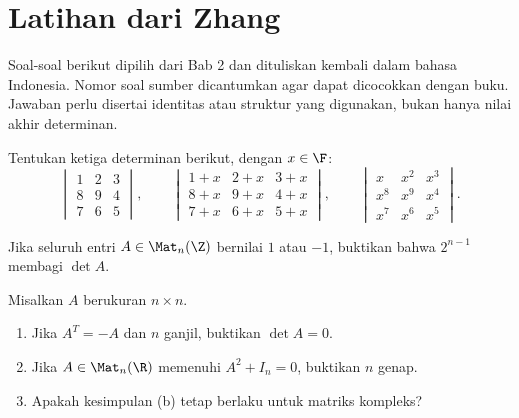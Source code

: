 \clearpage
\section{Latihan dari Zhang}
\label{det:latihan}

Soal-soal berikut dipilih dari Bab 2 \citet{zhang2009} dan dituliskan
kembali dalam bahasa Indonesia. Nomor soal sumber dicantumkan agar
dapat dicocokkan dengan buku. Jawaban perlu disertai identitas atau
struktur yang digunakan, bukan hanya nilai akhir determinan.

\begin{latihan}\label{det:lat-tigadeterminan}
      Tentukan ketiga determinan berikut, dengan $x\in\F$:
      \[
            \begin{vmatrix}1&2&3\\8&9&4\\7&6&5\end{vmatrix},\qquad
            \begin{vmatrix}1+x&2+x&3+x\\8+x&9+x&4+x\\7+x&6+x&5+x\end{vmatrix},
            \qquad
            \begin{vmatrix}x&x^2&x^3\\x^8&x^9&x^4\\x^7&x^6&x^5\end{vmatrix}.
      \]
\end{latihan}

\begin{latihan}\label{det:lat-divisibilitas}
      Jika seluruh entri $A\in\Mat_n(\Z)$ bernilai $1$ atau $-1$,
      buktikan bahwa $2^{n-1}$ membagi $\det A$.
\end{latihan}

\begin{latihan}\label{det:lat-paritas}
      Misalkan $A$ berukuran $n\times n$.
      \begin{enumerate}[label=(\alph*)]
            \item Jika $A^T=-A$ dan $n$ ganjil, buktikan $\det A=0$.
            \item Jika $A\in\Mat_n(\R)$ memenuhi $A^2+I_n=0$, buktikan $n$ genap.
            \item Apakah kesimpulan (b) tetap berlaku untuk matriks kompleks?
      \end{enumerate}
\end{latihan}

